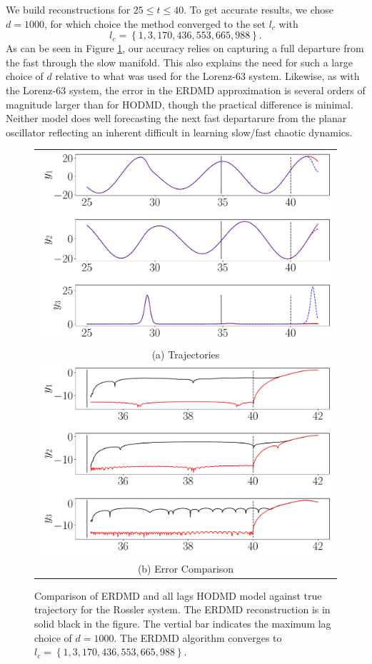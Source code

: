 \documentclass[a4paper,11pt]{article}
\begin{document}
We build reconstructions for $25\leq t \leq 40$.  To get accurate results, we chose $d=1000$, for which choice the method converged to the set $l_{c}$ with
\[
l_{c} = \left\{1, 3, 170, 436, 553, 665, 988\right\}.
\]
As can be seen in Figure \ref{fig:rossler}, our accuracy relies on capturing a full departure from the fast through the slow manifold.  This also explains the need for such a large choice of $d$ relative to what was used for the Lorenz-63 system.  Likewise, as with the Lorenz-63 system, the error in the ERDMD approximation is several orders of magnitude larger than for HODMD, though the practical difference is minimal.  Neither model does well forecasting the next fast departarure from the planar oscillator reflecting an inherent difficult in learning slow/fast chaotic dynamics.  
\begin{figure}[!h]
\centering
\begin{tabular}{c}
\includegraphics[width=.8\textwidth]{Rossler_compare_w_mx_lag_1000}\\
(a) Trajectories \\
\includegraphics[width=.8\textwidth]{Rossler_error_compare_w_mx_lag_1000}\\
(b) Error Comparison
\end{tabular}
\caption{Comparison of ERDMD and all lags HODMD model against true trajectory for the Rossler system.  The ERDMD reconstruction is in solid black in the figure.  The vertial bar indicates the maximum lag choice of $d=1000$. The ERDMD algorithm converges to $l_{c}=\left\{1, 3, 170, 436, 553, 665, 988\right\}$.}
\label{fig:rossler}
\end{figure}
\end{document}
